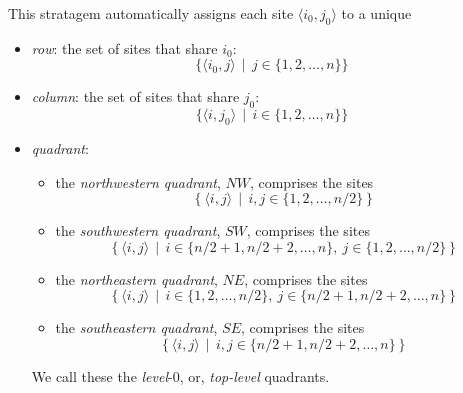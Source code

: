 \begin{enumerate}
\begin{itemize}
This stratagem automatically assigns each site $\langle i_0, j_0 \rangle$ to a unique
    \begin{itemize}
    \item
{\em row}: the set of sites that share $i_0$:
\[ \{ \langle i_0, j \rangle \ \ | \ \ j \in \{1, 2, \ldots, n\} \} \]
    \medskip\item
{\em column}: the set of sites that share $j_0$:
\[ \{ \langle i, j_0 \rangle \ \ | \ \ i \in \{1, 2, \ldots, n\} \} \]
    \medskip\item    
{\em quadrant}:
            \begin{itemize}
            \item
the {\em northwestern quadrant}, $NW$, comprises the sites
\[ \left\{ \langle i,j \rangle \ \ | \ \ i, j \in \{1, 2, \ldots, n/2 \} \right\} \]

            \medskip\item
the {\em southwestern quadrant}, $SW$, comprises the sites
\[ \left\{ \langle i,j \rangle \ \ | \ \ i \in \{ n/2 +1, n/2+2, \ldots, n \}, \ j \in \{1, 2, \ldots, n/2 \} \right\} \]

            \medskip\item
the {\em northeastern quadrant}, $NE$, comprises the sites
\[ \left\{ \langle i,j \rangle \ \ | \ \ i \in \{1, 2, \ldots, n/2 \}, \ j \in \{ n/2 +1, n/2+2, \ldots, n \}  \right\} \]

            \medskip\item
the {\em southeastern quadrant}, $SE$, comprises the sites
\[ \left\{ \langle i,j \rangle \ \ | \ \ i, j \in \{ n/2 +1, n/2+2, \ldots, n \} \right\} \]
          \end{itemize}

We call these the {\em level}-$0$, or, {\em top-level} quadrants.


\end{itemize}
\end{itemize}
\end{enumerate}
